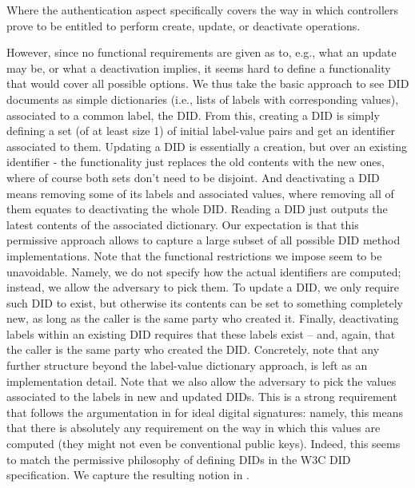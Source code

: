 Where the authentication aspect specifically covers the way in which controllers
prove to be entitled to perform create, update, or deactivate operations.

However, since no functional requirements are given as to, e.g., what an update
may be, or what a deactivation implies, it seems hard to define a functionality
that would cover all possible options.
%
We thus take the basic approach to see DID documents as simple dictionaries
(i.e., lists of labels with corresponding values), associated to a common label,
the DID. From this, creating a DID is simply defining a set (of at least size 1)
of initial label-value pairs and get an identifier associated to them. Updating
a DID is essentially a creation, but over an existing identifier - the
functionality just replaces the old contents with the new ones, where of course
both sets don't need to be disjoint. And deactivating a DID means removing some
of its labels and associated values, where removing all of them equates to
deactivating the whole DID. Reading a DID just outputs the latest contents of
the associated dictionary.
%
Our expectation is that this permissive approach allows to capture a large
subset of all possible DID method implementations. Note that the functional
restrictions we impose seem to be unavoidable. Namely, we do not specify how
the actual identifiers are computed; instead, we allow the adversary to pick
them. To update a DID, we only require such DID to exist, but otherwise its
contents can be set to something completely new, as long as the caller is the
same party who created it. Finally, deactivating labels within an existing DID
requires that these labels exist -- and, again, that the caller is the same
party who created the DID. Concretely, note that any further structure beyond
the label-value dictionary approach, is left as an implementation detail.
%
Note that we also allow the adversary to pick the values associated to the
labels in new and updated DIDs. This is a strong requirement that follows the
argumentation in \cite{canetti03} for ideal digital signatures: namely, this
means that there is absolutely any requirement on the way in which this values
are computed (they might not even be conventional public keys). Indeed, this
seems to match the permissive philosophy of defining DIDs in the W3C DID
specification.
%
%
We capture the resulting notion in .

